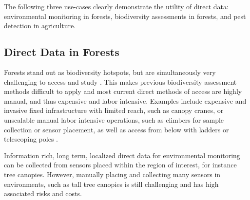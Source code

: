 The following three use-cases clearly demonstrate the utility of direct data: environmental monitoring in forests, biodiversity assessments in forests, and pest detection in agriculture.

\subsection{Direct Data in Forests}

Forests stand out as biodiversity hotspots, but are simultaneously very challenging to access and study \cite{Pillay2022, Ozanne2003d}. This makes previous biodiversity assessment methods difficult to apply and most current direct methods of access are highly manual, and thus expensive and labor intensive. Examples include expensive and invasive fixed infrastructure with limited reach, such as canopy cranes, or unscalable manual labor intensive operations, such as climbers for sample collection or sensor placement, as well as access from below with ladders or telescoping poles \cite{Cannon2021}. 

Information rich, long term, localized direct data for environmental monitoring can be collected from sensors placed within the region of interest, for instance tree canopies. 
However, manually placing and collecting many sensors in environments, such as tall tree canopies is still challenging and has high associated risks and costs.


